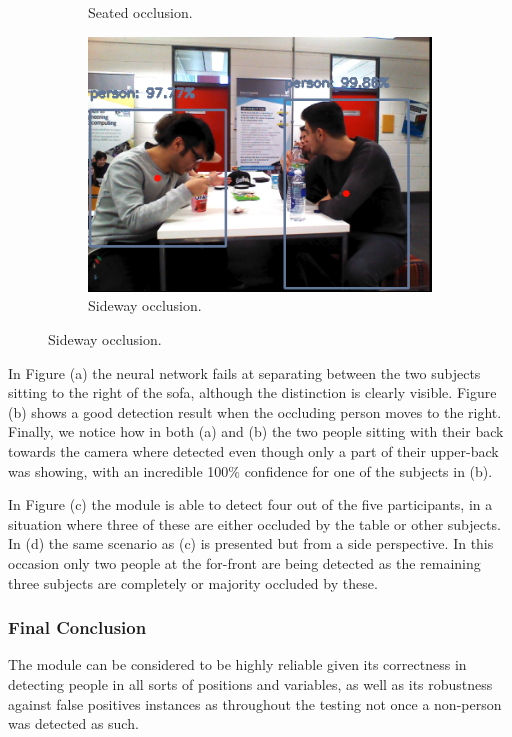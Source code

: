 \begin{figure}[H]
\begin{subfigure}{.5\textwidth}
        \caption{Seated occlusion.}
	\end{subfigure}
    \begin{subfigure}{.5\textwidth}
        \centering
        \includegraphics[width=.9\linewidth]{images/chapter6_occlusion_table_side.png}
        \caption{Sideway occlusion.}
	\end{subfigure}
\end{figure}

In Figure (a) the neural network fails at separating between the two subjects sitting to the right of the sofa, although the distinction is clearly visible. Figure (b) shows a good detection result when the occluding person moves to the right. Finally, we notice how in both (a) and (b) the two people sitting with their back towards the camera where detected even though only a part of their upper-back was showing, with an incredible 100\% confidence for one of the subjects in (b).

In Figure (c) the module is able to detect four out of the five participants, in a situation where three of these are either occluded by the table or other subjects. In (d) the same scenario as (c) is presented but from a side perspective. In this occasion only two people at the for-front are being detected as the remaining three subjects are completely or majority occluded by these.

\subsubsection{Final Conclusion}

The module can be considered to be highly reliable given its correctness in detecting people in all sorts of positions and variables, as well as its robustness against false positives instances as throughout the testing not once a non-person was detected as such.

